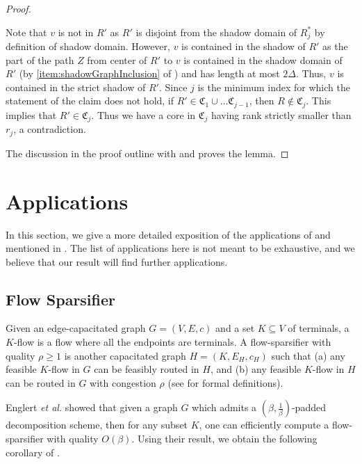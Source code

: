 \documentclass{theoretics}
\newcommand{\etal}{{\em et al. \xspace}}
\def\core{R}
\def\C{\mathfrak{C}}
\begin{document}
\begin{proof}
\begin{subproof}
		Note that $v$ is not in $\core'$ as $\core'$ is disjoint from the shadow domain of $\core^*_j$ by definition of shadow domain.
		However, $v$ is contained in the shadow of $\core'$ as the part of the path $Z$ from center of $\core'$ to $v$ is contained in the shadow domain of $\core'$ (by \cref{item:shadowGraphInclusion} of ) and has length at most $2\Delta$.
		Thus, $v$ is contained in the strict shadow of $\core'$.
		Since $j$ is the minimum index for which the statement of the claim does not hold, if $\core'\in \C_1 \cup \ldots \C_{j-1}$, then $\core \not \in \C_j$. This implies that $\core'\in \C_j$.
		Thus we have a core in $\C_j$ having rank strictly smaller than $r_j$, a contradiction.
	\end{subproof}
	
	The discussion in the proof outline with  and  proves the lemma. 
\end{proof}





\section{Applications} \label{sec:apps}

In this section, we give a more detailed exposition of the applications of  and  mentioned in . The list of applications here is not meant to be exhaustive, and we believe that our result will find further applications. 

\subsection{Flow Sparsifier}
Given an edge-capacitated graph $G = (V,E,c)$ and a set $K\subseteq V$ of terminals, a $K$-flow is a flow where all the endpoints are terminals. A flow-sparsifier with quality $\rho\ge1$ is another capacitated graph $H = (K,E_H, c_H)$ such that (a) any feasible $K$-flow in $G$ can be feasibly routed in $H$, and (b) any feasible $K$-flow in $H$ can be routed in $G$ with congestion $\rho$ (see \cite{EGKRTT14} for formal definitions).

Englert \etal \cite{EGKRTT14} showed that given a graph $G$ which admits a $(\beta,\frac1\beta)$-padded decomposition scheme, then for any subset $K$, one can efficiently compute a flow-sparsifier with
quality $O(\beta)$. Using their result, we obtain the following corollary of . 
\end{document}

